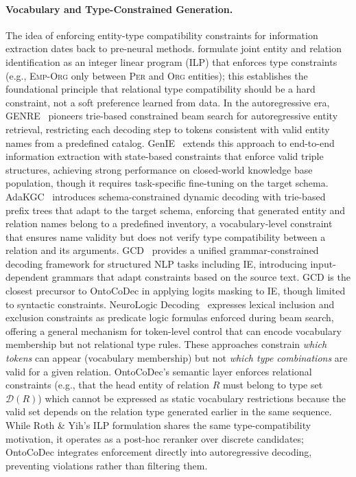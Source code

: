 \paragraph{Vocabulary and Type-Constrained Generation.}
The idea of enforcing entity-type compatibility constraints for information extraction dates back to pre-neural methods.
\citet{roth_yih_2004} formulate joint entity and relation identification as an integer linear program (ILP) that enforces type constraints (e.g., \textsc{Emp-Org} only between \textsc{Per} and \textsc{Org} entities); this establishes the foundational principle that relational type compatibility should be a hard constraint, not a soft preference learned from data.
In the autoregressive era, GENRE~\cite{decao2021genre} pioneers trie-based constrained beam search for autoregressive entity retrieval, restricting each decoding step to tokens consistent with valid entity names from a predefined catalog.
GenIE~\cite{josifoski2022genie} extends this approach to end-to-end information extraction with state-based constraints that enforce valid triple structures, achieving strong performance on closed-world knowledge base population, though it requires task-specific fine-tuning on the target schema.
AdaKGC~\cite{adakgc_emnlp2023} introduces schema-constrained dynamic decoding with trie-based prefix trees that adapt to the target schema, enforcing that generated entity and relation names belong to a predefined inventory, a vocabulary-level constraint that ensures name validity but does not verify type compatibility between a relation and its arguments.
GCD~\cite{geng2023gcd} provides a unified grammar-constrained decoding framework for structured NLP tasks including IE, introducing input-dependent grammars that adapt constraints based on the source text. GCD is the closest precursor to OntoCoDec in applying logits masking to IE, though limited to syntactic constraints.
NeuroLogic Decoding~\cite{lu2021neurologic} expresses lexical inclusion and exclusion constraints as predicate logic formulas enforced during beam search, offering a general mechanism for token-level control that can encode vocabulary membership but not relational type rules.
These approaches constrain \emph{which tokens} can appear (vocabulary membership) but not \emph{which type combinations} are valid for a given relation.
OntoCoDec's semantic layer enforces relational constraints (e.g., that the head entity of relation $R$ must belong to type set $\mathcal{D}(R)$) which cannot be expressed as static vocabulary restrictions because the valid set depends on the relation type generated earlier in the same sequence.
While Roth \& Yih's ILP formulation shares the same type-compatibility motivation, it operates as a post-hoc reranker over discrete candidates; OntoCoDec integrates enforcement directly into autoregressive decoding, preventing violations rather than filtering them.

